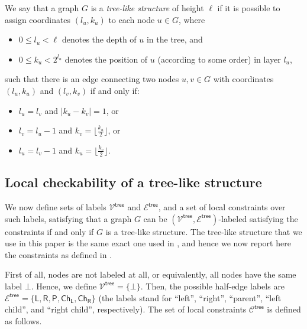 \documentclass[11pt]{article}
\newcommand{\lparent}{\mathsf {P}}
\newcommand{\lleft}{\mathsf {L}}
\newcommand{\lright}{\mathsf {R}}
\newcommand{\llch}{\ensuremath{\mathsf {Ch_L}}}
\newcommand{\lrch}{\ensuremath{\mathsf {Ch_R}}}
\newcommand{\ltreelike}{\mathsf {tree}}
\begin{document}
\begin{definition}
	We say that a graph $G$ is a \emph{tree-like structure} of height $\ell$ if it is possible to assign coordinates $(l_u, k_u)$ to each node $u\in G$, where
	\begin{itemize}[noitemsep]
		\item $0\le l_u < \ell$ denotes the depth of $u$ in the tree, and
		\item $0\le k_u < 2^{l_u}$ denotes the position of $u$ (according to some order) in layer $l_u$,
	\end{itemize}
	such that there is an edge connecting two nodes $u,v\in G$ with coordinates $(l_u, k_u)$ and $(l_v, k_v)$ if and only if:
	\begin{itemize}[noitemsep]
		\item $l_u = l_v$ and $|k_u - k_v | = 1$, or
		\item $l_v = l_u-1$ and $k_v = \lfloor \frac{k_u}{2} \rfloor$, or
		\item $l_u = l_v-1$ and $k_u = \lfloor \frac{k_v}{2} \rfloor$.
	\end{itemize}
\end{definition}




\subsection{Local checkability of a tree-like structure}
We now define sets of labels $\mathcal{V^\ltreelike}$ and $\mathcal{E^\ltreelike}$, and a set of local constraints over such labels, satisfying that a graph $G$ can be $(\mathcal{V^\ltreelike},\mathcal{E^\ltreelike})$-labeled satisfying the constraints if and only if $G$ is a tree-like structure.
The tree-like structure that we use in this paper is the same exact one used in \cite{congest-lcls}, and hence we now report here the constraints as defined in \cite{congest-lcls}.

First of all, nodes are not labeled at all, or equivalently, all nodes have the same label $\bot$. Hence, we define $\mathcal{V^\ltreelike} = \{\bot\}$. Then, the possible half-edge labels are $\mathcal{E^\ltreelike} = \{\lleft,\lright, \lparent,\llch,\lrch\}$ (the labels stand for ``left'', ``right'', ``parent'',  ``left child'', and ``right child'', respectively). 
The set of local constraints $\mathcal{C}^{\ltreelike}$ is defined as follows.
\end{document}

